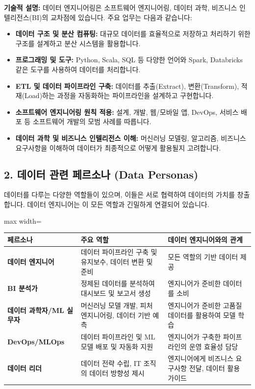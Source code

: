 \documentclass[11pt,a4paper]{article}
\theoremstyle{definition}
\begin{document}
\textbf{기술적 설명:}
데이터 엔지니어링은 소프트웨어 엔지니어링, 데이터 과학, 비즈니스 인텔리전스(BI)의 교차점에 있습니다.
주요 업무는 다음과 같습니다:
\begin{itemize}
    \item \textbf{데이터 구조 및 분산 컴퓨팅:} 대규모 데이터를 효율적으로 저장하고 처리하기 위한 구조를 설계하고 분산 시스템을 활용합니다.
    \item \textbf{프로그래밍 및 도구:} Python, Scala, SQL 등 다양한 언어와 Spark, Databricks 같은 도구를 사용하여 데이터를 처리합니다.
    \item \textbf{ETL 및 데이터 파이프라인 구축:} 데이터를 추출(Extract), 변환(Transform), 적재(Load)하는 과정을 자동화하는 파이프라인을 설계하고 구현합니다.
    \item \textbf{소프트웨어 엔지니어링 원칙 적용:} 설계, 개발, 웹/모바일 앱, DevOps, 서비스 배포 등 소프트웨어 개발의 모범 사례를 따릅니다.
    \item \textbf{데이터 과학 및 비즈니스 인텔리전스 이해:} 머신러닝 모델링, 알고리즘, 비즈니스 요구사항을 이해하여 데이터가 최종적으로 어떻게 활용될지 고려합니다.
\end{itemize}

\subsection*{2. 데이터 관련 페르소나 (Data Personas)}

데이터를 다루는 다양한 역할들이 있으며, 이들은 서로 협력하여 데이터의 가치를 창출합니다. 데이터 엔지니어는 이 모든 역할과 긴밀하게 연결되어 있습니다.

\begin{adjustbox}{max width=\textwidth}
\begin{tabular}{lll}
\toprule
\textbf{페르소나} & \textbf{주요 역할} & \textbf{데이터 엔지니어와의 관계} \\
\midrule
\textbf{데이터 엔지니어} & 데이터 파이프라인 구축 및 유지보수, 데이터 변환 및 준비 & 모든 역할의 기반 데이터 제공 \\
\textbf{BI 분석가} & 정제된 데이터를 분석하여 대시보드 및 보고서 생성 & 엔지니어가 준비한 데이터를 소비 \\
\textbf{데이터 과학자/ML 실무자} & 머신러닝 모델 개발, 피처 엔지니어링, 데이터 기반 예측 & 엔지니어가 준비한 고품질 데이터를 활용하여 모델 학습 \\
\textbf{DevOps/MLOps} & 데이터 파이프라인 및 ML 모델 배포 및 자동화 지원 & 엔지니어가 구축한 파이프라인의 운영 효율성 담당 \\
\textbf{데이터 리더} & 데이터 전략 수립, IT 조직의 데이터 방향성 제시 & 엔지니어에게 비즈니스 요구사항 전달, 데이터 활용 가이드 \\
\bottomrule
\end{tabular}
\end{adjustbox}
\end{document}

